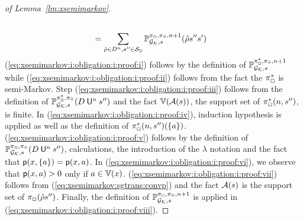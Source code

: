 \begin{proof}[of Lemma~\ref{lm:xsemimarkov}]
\begin{align}
    \label{eq:xsemimarkov:i:obligation:i:proof:vii} \\
    & =
    \sum_{\hat{\rho}\in D^n,s''\in\mathcal{S}_{\Box}}\mathbb{P}^{\pi_{{\Box}},\pi_{{\Diamond}},n+1}_{{\mathcal{G}_{\mathcal{K}}},s}(\hat{\rho}s''s')
    \label{eq:xsemimarkov:i:obligation:i:proof:viii}
  \end{align}
  (\ref{eq:xsemimarkov:i:obligation:i:proof:i}) follows by the
  definition of
  $\mathbb{P}^{\pi^*_{{\Box}},\pi_{{\Diamond}},n+1}_{{\mathcal{G}_{\mathcal{K}}},s}$
  while (\ref{eq:xsemimarkov:i:obligation:i:proof:ii}) follows from
  the fact the $\pi^*_{\Box}$ is semi-Markov.
  Step (\ref{eq:xsemimarkov:i:obligation:i:proof:iii}) follows from
  the definition of
  $\mathbb{P}^{\pi^*_{{\Box}},\pi_{{\Diamond}}}_{{\mathcal{G}_{\mathcal{K}}},s}(D \mathbin{\mathsf{U}}^n s'')$
  and the fact $\mathbb{V}(\mathcal{A}(s))$, the support set of
  $\pi^*_{{\Box}}(n,s'')$, is finite.
  In (\ref{eq:xsemimarkov:i:obligation:i:proof:iv}), induction
  hypothesis is applied as well as the definition of
  $\pi^*_{{\Box}}(n,s'')(\{a\})$.
  (\ref{eq:xsemimarkov:i:obligation:i:proof:v}) follows by the
  definition of
  $\mathbb{P}^{\pi_{{\Box}},\pi_{{\Diamond}}}_{{\mathcal{G}_{\mathcal{K}}},s}(D \mathbin{\mathsf{U}}^n s'')$,
  calculations, the introduction of the $\lambda$ notation and the
  fact that $\mathsf{p}(x,\{a\})=\mathsf{p}(x,a)$.
  In (\ref{eq:xsemimarkov:i:obligation:i:proof:vi}), we observe that
  $\mathsf{p}(x,a)>0$ only if $a\in\mathbb{V}(x)$.
  (\ref{eq:xsemimarkov:i:obligation:i:proof:vii}) follows from
  (\ref{eq:xsemimarkov:sgtrans:convp}) and the fact $\mathcal{A}(s)$ is
  the support set of $\pi_{\Box}(\hat{\rho}s'')$.
  Finally, the definition of
  $\mathbb{P}^{\pi_{{\Box}},\pi_{{\Diamond}},n+1}_{{\mathcal{G}_{\mathcal{K}}},s}$ is
  applied in (\ref{eq:xsemimarkov:i:obligation:i:proof:viii}).


\end{proof}
